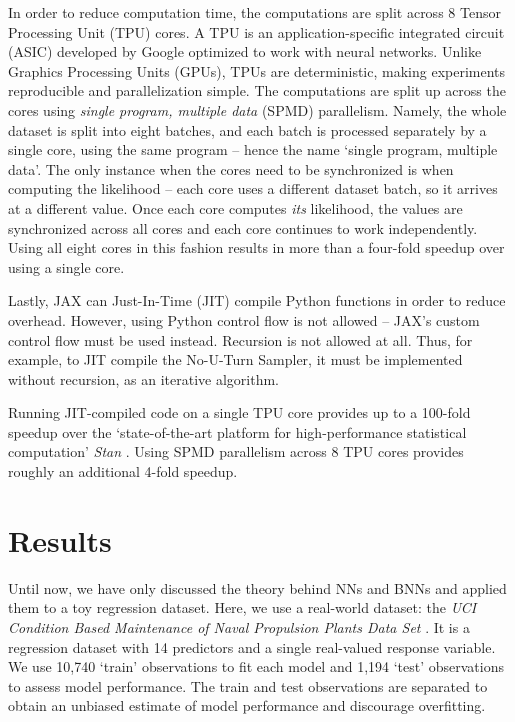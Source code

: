 \documentclass[12pt]{article}
\begin{document}
In order to reduce computation time, the computations are split across 8 Tensor Processing Unit (TPU) cores. A TPU is an application-specific integrated circuit (ASIC) developed by Google optimized to work with neural networks. Unlike Graphics Processing Units (GPUs), TPUs are deterministic, making experiments reproducible and parallelization simple. The computations are split up across the cores using \textit{single program, multiple data} (SPMD) parallelism. Namely, the whole dataset is split into eight batches, and each batch is processed separately by a single core, using the same program -- hence the name `single program, multiple data'. The only instance when the cores need to be synchronized is when computing the likelihood -- each core uses a different dataset batch, so it arrives at a different value. Once each core computes \textit{its} likelihood, the values are synchronized across all cores and each core continues to work independently. Using all eight cores in this fashion results in more than a four-fold speedup over using a single core. 

Lastly, JAX can Just-In-Time (JIT) compile Python functions in order to reduce overhead. However, using Python control flow is not allowed -- JAX's custom control flow must be used instead. Recursion is not allowed at all. Thus, for example, to JIT compile the No-U-Turn Sampler, it must be implemented without recursion, as an iterative algorithm.

Running JIT-compiled code on a single TPU core provides up to a 100-fold speedup over the `state-of-the-art platform for high-performance statistical computation' \textit{Stan} \cite{stan}. Using SPMD parallelism across 8 TPU cores provides roughly an additional 4-fold speedup.

\section{Results}
\label{sec_results}

Until now, we have only discussed the theory behind NNs and BNNs and applied them to a toy regression dataset. Here, we use a real-world dataset: the \textit{UCI Condition Based Maintenance of Naval Propulsion Plants Data Set} \cite{uci}. It is a regression dataset with 14 predictors and a single real-valued response variable. We use 10,740 `train' observations to fit each model and 1,194 `test' observations to assess model performance. The train and test observations are separated to obtain an unbiased estimate of model performance and discourage overfitting.
\end{document}
